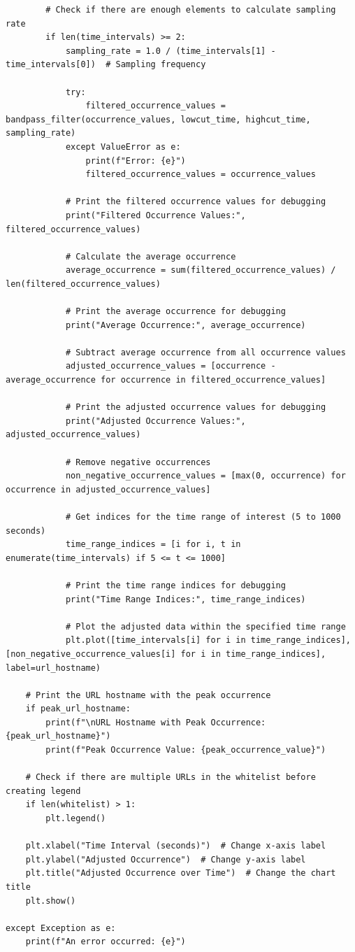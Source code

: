 \begin{lstlisting}
        # Check if there are enough elements to calculate sampling rate
        if len(time_intervals) >= 2:
            sampling_rate = 1.0 / (time_intervals[1] - time_intervals[0])  # Sampling frequency

            try:
                filtered_occurrence_values = bandpass_filter(occurrence_values, lowcut_time, highcut_time, sampling_rate)
            except ValueError as e:
                print(f"Error: {e}")
                filtered_occurrence_values = occurrence_values

            # Print the filtered occurrence values for debugging
            print("Filtered Occurrence Values:", filtered_occurrence_values)

            # Calculate the average occurrence
            average_occurrence = sum(filtered_occurrence_values) / len(filtered_occurrence_values)

            # Print the average occurrence for debugging
            print("Average Occurrence:", average_occurrence)

            # Subtract average occurrence from all occurrence values
            adjusted_occurrence_values = [occurrence - average_occurrence for occurrence in filtered_occurrence_values]

            # Print the adjusted occurrence values for debugging
            print("Adjusted Occurrence Values:", adjusted_occurrence_values)

            # Remove negative occurrences
            non_negative_occurrence_values = [max(0, occurrence) for occurrence in adjusted_occurrence_values]

            # Get indices for the time range of interest (5 to 1000 seconds)
            time_range_indices = [i for i, t in enumerate(time_intervals) if 5 <= t <= 1000]

            # Print the time range indices for debugging
            print("Time Range Indices:", time_range_indices)

            # Plot the adjusted data within the specified time range
            plt.plot([time_intervals[i] for i in time_range_indices], [non_negative_occurrence_values[i] for i in time_range_indices], label=url_hostname)

    # Print the URL hostname with the peak occurrence
    if peak_url_hostname:
        print(f"\nURL Hostname with Peak Occurrence: {peak_url_hostname}")
        print(f"Peak Occurrence Value: {peak_occurrence_value}")

    # Check if there are multiple URLs in the whitelist before creating legend
    if len(whitelist) > 1:
        plt.legend()

    plt.xlabel("Time Interval (seconds)")  # Change x-axis label
    plt.ylabel("Adjusted Occurrence")  # Change y-axis label
    plt.title("Adjusted Occurrence over Time")  # Change the chart title
    plt.show()

except Exception as e:
    print(f"An error occurred: {e}")
\end{lstlisting}